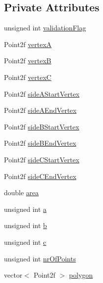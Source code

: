 \subsection*{\-Private \-Attributes}
\begin{DoxyCompactItemize}
\item 
unsigned int \hyperlink{classmultiscale_1_1MinEnclosingTriangleFinder_a19f9149638eddeec22b775eef632c6ef}{validation\-Flag}
\item 
\-Point2f \hyperlink{classmultiscale_1_1MinEnclosingTriangleFinder_adb758ed8b7e8758436d9f1bb381e017e}{vertex\-A}
\item 
\-Point2f \hyperlink{classmultiscale_1_1MinEnclosingTriangleFinder_a18e5ea5e0b341b3d02c4a75887f44c9c}{vertex\-B}
\item 
\-Point2f \hyperlink{classmultiscale_1_1MinEnclosingTriangleFinder_a0fc6887251f73b19714f39888534cdaa}{vertex\-C}
\item 
\-Point2f \hyperlink{classmultiscale_1_1MinEnclosingTriangleFinder_a2e9e3f20e0c0d8bcf34e8ce903aabb42}{side\-A\-Start\-Vertex}
\item 
\-Point2f \hyperlink{classmultiscale_1_1MinEnclosingTriangleFinder_a132a1e2eed61d579e6038089fe08d150}{side\-A\-End\-Vertex}
\item 
\-Point2f \hyperlink{classmultiscale_1_1MinEnclosingTriangleFinder_a5f6c0f9361e4aab168f068f08b700742}{side\-B\-Start\-Vertex}
\item 
\-Point2f \hyperlink{classmultiscale_1_1MinEnclosingTriangleFinder_a8e3929795823c49572ff65a4f04462c6}{side\-B\-End\-Vertex}
\item 
\-Point2f \hyperlink{classmultiscale_1_1MinEnclosingTriangleFinder_a877d0c34c4803643699d8fd176c24d4e}{side\-C\-Start\-Vertex}
\item 
\-Point2f \hyperlink{classmultiscale_1_1MinEnclosingTriangleFinder_a3f0f5bbef4e89caed8d153f1fc2eccea}{side\-C\-End\-Vertex}
\item 
double \hyperlink{classmultiscale_1_1MinEnclosingTriangleFinder_a64ea18728dc70fd6235961c12802123a}{area}
\item 
unsigned int \hyperlink{classmultiscale_1_1MinEnclosingTriangleFinder_acb13371219bdd9b7c57131f1535e4c89}{a}
\item 
unsigned int \hyperlink{classmultiscale_1_1MinEnclosingTriangleFinder_a71355f44126b38a4fb55c0c92ab64816}{b}
\item 
unsigned int \hyperlink{classmultiscale_1_1MinEnclosingTriangleFinder_a758f39b2d0cf35337f28d8ed871c2c0b}{c}
\item 
unsigned int \hyperlink{classmultiscale_1_1MinEnclosingTriangleFinder_a92409868a6731f5e41878085f3ac0f73}{nr\-Of\-Points}
\item 
vector$<$ \-Point2f $>$ \hyperlink{classmultiscale_1_1MinEnclosingTriangleFinder_add5aecf2c138345091d55076bdc253a4}{polygon}
\end{DoxyCompactItemize}
